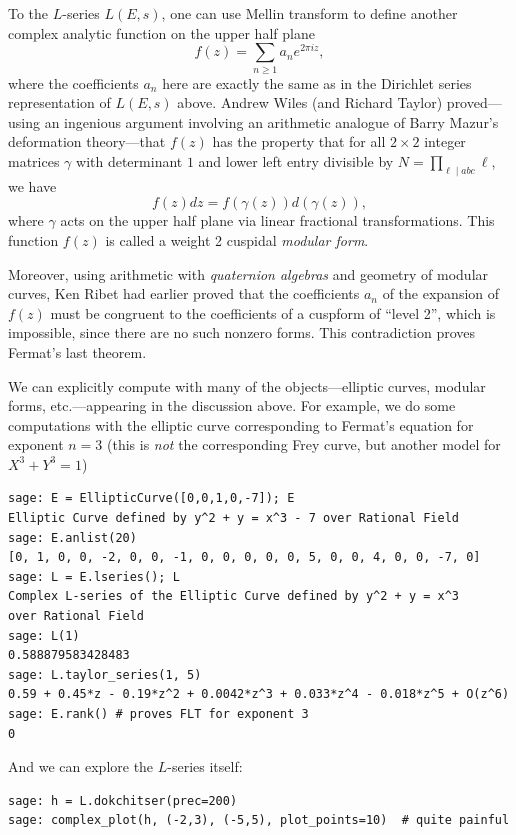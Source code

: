 \documentclass{book}
\theoremstyle{plain}
\theoremstyle{definition}
\numberwithin{equation}{section}
\numberwithin{figure}{section}
\numberwithin{table}{section}
\begin{document}
To the $L$-series $L(E,s)$, one can use
Mellin transform to define another complex analytic function
on the upper half plane
$$
f(z) = \sum_{n\geq 1} a_n e^{2\pi i z},
$$
where the coefficients $a_n$ here are exactly the same as
in the Dirichlet series representation of $L(E,s)$ above.
Andrew Wiles (and Richard Taylor) proved---using an ingenious
argument involving an arithmetic analogue of Barry Mazur's
deformation theory---that
$f(z)$ has the property that for
all $2\times 2$ integer matrices
$\gamma$ with determinant $1$ and lower left entry divisible
by $N=\prod_{\ell\mid abc} \ell$, we have
$$
  f(z) dz = f(\gamma(z)) d(\gamma(z)),
$$
where $\gamma$ acts on the upper half plane
via linear fractional transformations.  This function
$f(z)$ is called a weight 2 cuspidal {\em modular form}.

Moreover, using arithmetic with {\em quaternion algebras} and
geometry of modular curves, Ken Ribet had earlier proved that
the coefficients $a_n$ of the expansion of
$f(z)$ must be congruent to the coefficients
of a cuspform of ``level 2'', which is
impossible, since there are no such nonzero forms.
This contradiction proves Fermat's last theorem.

We can explicitly compute with many of the
objects---elliptic curves, modular forms, etc.---appearing
in the discussion above.
For example, we do some computations with the elliptic
curve corresponding to Fermat's equation for exponent $n=3$
(this is {\em not} the corresponding Frey curve, but another
model for $X^3+Y^3=1$)
\begin{lstlisting}
sage: E = EllipticCurve([0,0,1,0,-7]); E
Elliptic Curve defined by y^2 + y = x^3 - 7 over Rational Field
sage: E.anlist(20)
[0, 1, 0, 0, -2, 0, 0, -1, 0, 0, 0, 0, 0, 5, 0, 0, 4, 0, 0, -7, 0]
sage: L = E.lseries(); L
Complex L-series of the Elliptic Curve defined by y^2 + y = x^3
over Rational Field
sage: L(1)
0.588879583428483
sage: L.taylor_series(1, 5)
0.59 + 0.45*z - 0.19*z^2 + 0.0042*z^3 + 0.033*z^4 - 0.018*z^5 + O(z^6)
sage: E.rank() # proves FLT for exponent 3
0
\end{lstlisting}
And we can explore the $L$-series itself:
\begin{lstlisting}
sage: h = L.dokchitser(prec=200)
sage: complex_plot(h, (-2,3), (-5,5), plot_points=10)  # quite painful
\end{lstlisting}
\end{document}
